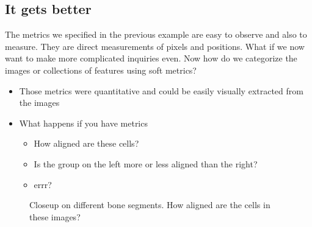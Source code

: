 \documentclass[letterpaper,10pt,english]{sphinxmanual}
\begin{document}
\subsection{It gets better}
\label{\detokenize{01-Introduction:it-gets-better}}
\sphinxAtStartPar
The metrics we specified in the previous example are easy to observe and also to measure. They are direct measurements of pixels and positions. What if we now want to make more complicated inquiries even. Now how do we categorize the images or collections of features using soft metrics?
\begin{itemize}
\item {} 
\sphinxAtStartPar
Those metrics were quantitative and could be easily visually extracted from the images

\item {} 
\sphinxAtStartPar
What happens if you have  metrics
\begin{itemize}
\item {} 
\sphinxAtStartPar
How aligned are these cells?

\item {} 
\sphinxAtStartPar
Is the group on the left more or less aligned than the right?

\item {} 
\sphinxAtStartPar
errr?

\end{itemize}

\end{itemize}



\begin{figure}[htbp]
\centering
\capstart

\noindent{}
\caption{Close\sphinxhyphen{}up on different bone segments. How aligned are the cells in these images?}\label{\detokenize{01-Introduction:id14}}\end{figure}
\end{document}
